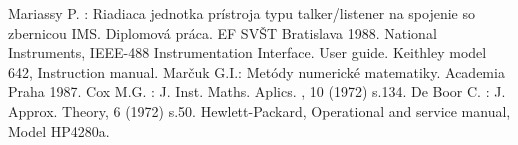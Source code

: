 \begin{thebibliography}{}
 Mariassy P. : Riadiaca jednotka prístroja typu
  talker/listener na spojenie so zbernicou IMS. Diplomová práca. EF
  SVŠT Bratislava 1988.
 National Instruments, IEEE-488 Instrumentation
  Interface. User guide.
 Keithley model 642, Instruction manual.
 Marčuk G.I.: Metódy numerické matematiky. Academia
  Praha 1987.
 Cox M.G. : J. Inst. Maths. Aplics. , 10 (1972)
  s.134.
 De Boor C. : J. Approx. Theory, 6 (1972) s.50.
 Hewlett-Packard, Operational and service manual,
  Model HP4280a.
\end{thebibliography}
